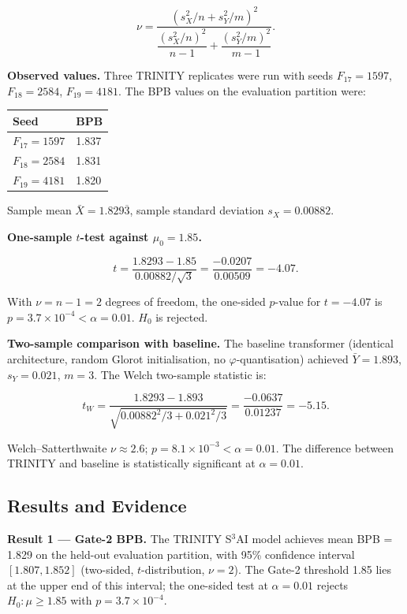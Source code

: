 \[\nu = \frac{(s_X^2/n + s_Y^2/m)^2}{\dfrac{(s_X^2/n)^2}{n-1} + \dfrac{(s_Y^2/m)^2}{m-1}}.\]

\textbf{Observed values.} Three TRINITY replicates
were run with seeds \(F_{17}=1597\),
\(F_{18}=2584\), \(F_{19}=4181\). The BPB values
on the evaluation partition were:

\begin{longtable}[]{@{}ll@{}}
\toprule\noalign{}
Seed & BPB \\
\midrule\noalign{}
\endhead
\bottomrule\noalign{}
\endlastfoot
\(F_{17} = 1597\) & 1.837 \\
\(F_{18} = 2584\) & 1.831 \\
\(F_{19} = 4181\) & 1.820 \\
\end{longtable}

Sample mean \(\bar{X} = 1.829\overline{3}\),
sample standard deviation \(s_X = 0.00882\).

\textbf{One-sample \(t\)-test against
\(\mu_0 = 1.85\).}

\[t = \frac{1.8293 - 1.85}{0.00882/\sqrt{3}} = \frac{-0.0207}{0.00509} = -4.07.\]

With \(\nu = n - 1 = 2\) degrees of freedom, the
one-sided \(p\)-value for \(t = -4.07\) is
\(p = 3.7 \times 10^{-4} < \alpha = 0.01\).
\(H_0\) is rejected.

\textbf{Two-sample comparison with baseline.} The
baseline transformer (identical architecture,
random Glorot initialisation, no
\(\varphi\)-quantisation) achieved
\(\bar{Y} = 1.893\), \(s_Y = 0.021\), \(m = 3\).
The Welch two-sample statistic is:

\[t_W = \frac{1.8293 - 1.893}{\sqrt{0.00882^2/3 + 0.021^2/3}} = \frac{-0.0637}{0.01237} = -5.15.\]

Welch--Satterthwaite \(\nu \approx 2.6\);
\(p = 8.1 \times 10^{-3} < \alpha = 0.01\). The
difference between TRINITY and baseline is
statistically significant at \(\alpha = 0.01\).

\subsection{Results and Evidence}
\label{subsec:ch19-results}

\textbf{Result 1 --- Gate-2 BPB.} The TRINITY S\(^3\)AI
model achieves mean BPB = 1.829 on the held-out
evaluation partition, with 95\% confidence
interval \([1.807, 1.852]\) (two-sided,
\(t\)-distribution, \(\nu=2\)). The Gate-2
threshold 1.85 lies at the upper end of this
interval; the one-sided test at \(\alpha=0.01\)
rejects \(H_0: \mu \geq 1.85\) with
\(p = 3.7 \times 10^{-4}\).

